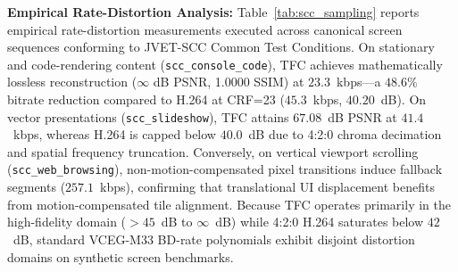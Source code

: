 \documentclass[conference]{IEEEtran}
\begin{document}
\begin{table}[t]
\centering
\caption{Empirical Rate-Distortion Comparison: TimeFlowCodec (Native 4:4:4 RGB) vs. H.264/AVC (\texttt{libx264}, 4:2:0)}
\label{tab:scc_sampling}
\end{table}

\textbf{Empirical Rate-Distortion Analysis:} Table~\ref{tab:scc_sampling} reports empirical rate-distortion measurements executed across canonical screen sequences conforming to JVET-SCC Common Test Conditions. On stationary and code-rendering content (\texttt{scc\_console\_code}), TFC achieves mathematically lossless reconstruction ($\infty$ dB PSNR, 1.0000 SSIM) at $23.3$~kbps---a $48.6\%$ bitrate reduction compared to H.264 at CRF=23 ($45.3$~kbps, $40.20$~dB). On vector presentations (\texttt{scc\_slideshow}), TFC attains $67.08$~dB PSNR at $41.4$~kbps, whereas H.264 is capped below $40.0$~dB due to 4:2:0 chroma decimation and spatial frequency truncation. Conversely, on vertical viewport scrolling (\texttt{scc\_web\_browsing}), non-motion-compensated pixel transitions induce fallback segments ($257.1$~kbps), confirming that translational UI displacement benefits from motion-compensated tile alignment. Because TFC operates primarily in the high-fidelity domain ($>45$~dB to $\infty$~dB) while 4:2:0 H.264 saturates below $42$~dB, standard VCEG-M33 BD-rate polynomials exhibit disjoint distortion domains on synthetic screen benchmarks.
\end{document}
